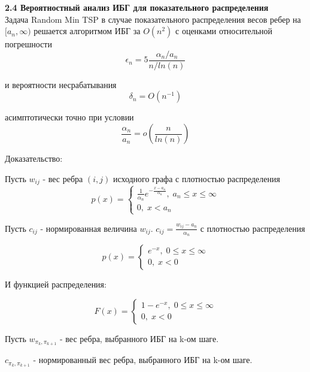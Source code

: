 \documentclass[a4paper, 14pt]{extarticle}
\begin{document}
\textbf{2.4 Вероятностный анализ ИБГ для показательного распределения}\\


Задача Random Min TSP в случае показательного распределения весов ребер на $[a_n,\infty)$ решается алгоритмом ИБГ за $O(n^2)$ с оценками относительной погрешности
\begin{equation}
\epsilon_n = 5 \frac{\alpha_n/a_n}{n/ln(n)}
\end{equation}

и вероятности несрабатывания
\begin{equation}
\delta_n = O(n^{-1})
\end{equation}

асимптотически точно при условии
\begin{equation}
\frac{\alpha_n}{a_n} = o(\frac{n}{ln(n)})
\end{equation}

Доказательство:

Пусть $w_{ij}$ - вес ребра $(i, j)$ исходного графа с плотностью распределения
\begin{equation}
p(x) = \begin{cases}
\frac{1}{\alpha_n} e^{-\frac{x-a_n}{\alpha_n}}, \; a_n \leq x \leq \infty \\
0, \; x < a_n
\end{cases}
\end{equation}

Пусть $c_{ij}$ - нормированная величина $w_{ij}$. $c_{ij} = \frac{w_{ij}-a_n}{\alpha_n}$  с плотностью распределения

\begin{equation}
p(x) = \begin{cases}
 e^{-x}, \; 0 \leq x \leq \infty \\
0, \; x < 0
\end{cases}
\end{equation}

И функцией распределения:

\begin{equation}
F(x) = \begin{cases}
 1-e^{-x}, \; 0 \leq x \leq \infty \\
0, \; x < 0
\end{cases}
\end{equation}

Пусть $w_{\pi_k, \pi_{k+1}}$ - вес ребра, выбранного ИБГ на k-ом шаге.

$c_{\pi_k, \pi_{k+1}}$ - нормированный вес ребра, выбранного ИБГ на k-ом шаге.
\end{document}
